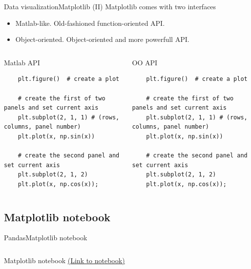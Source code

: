 \documentclass[10pt,compress]{beamer} %
\begin{document}
\begin{frame}[fragile]{Data visualization}{Matplotlib (II)}
	Matplotlib comes with two interfaces
	\begin{itemize}
		\item Matlab-like. Old-fashioned function-oriented API.
		\item Object-oriented. Object-oriented and more powerfull API.
	\end{itemize}

	\begin{columns}
	\begin{exampleblock}{Matlab API}
	\vspace{-0.2cm} 
	\begin{lstlisting}
	plt.figure()  # create a plot

	# create the first of two panels and set current axis
	plt.subplot(2, 1, 1) # (rows, columns, panel number)
	plt.plot(x, np.sin(x))

	# create the second panel and set current axis
	plt.subplot(2, 1, 2)
	plt.plot(x, np.cos(x));
	\end{lstlisting}
	\vspace{-0.2cm} 
	\end{exampleblock}

	\begin{exampleblock}{OO API}
	\vspace{-0.2cm} 
	\begin{lstlisting}
	plt.figure()  # create a plot

	# create the first of two panels and set current axis
	plt.subplot(2, 1, 1) # (rows, columns, panel number)
	plt.plot(x, np.sin(x))

	# create the second panel and set current axis
	plt.subplot(2, 1, 2)
	plt.plot(x, np.cos(x));
	\end{lstlisting}
	\vspace{-0.2cm} 
	\end{exampleblock}
	\end{columns}
\end{frame}

\subsection{Matplotlib notebook}
\begin{frame}{Pandas}{Matplotlib notebook}
    \begin{columns}
 	   \column{0.5\textwidth}
			\begin{block}{Matplotlib notebook}
			\href{https://github.com/dfbarrero/dataCourse/blob/master/dataviz/DatavizWithMatplotlib.ipynb}{(Link to notebook)}
			\end{block}
	\end{columns}
\end{frame}
\end{document}
